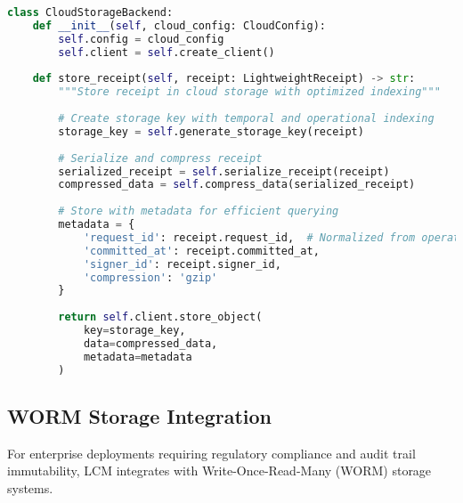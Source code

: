 \documentclass[12pt,a4paper]{article}
\begin{document}
\begin{lstlisting}[language=Python, caption=Cloud Storage Integration]
class CloudStorageBackend:
    def __init__(self, cloud_config: CloudConfig):
        self.config = cloud_config
        self.client = self.create_client()
    
    def store_receipt(self, receipt: LightweightReceipt) -> str:
        """Store receipt in cloud storage with optimized indexing"""
        
        # Create storage key with temporal and operational indexing
        storage_key = self.generate_storage_key(receipt)
        
        # Serialize and compress receipt
        serialized_receipt = self.serialize_receipt(receipt)
        compressed_data = self.compress_data(serialized_receipt)
        
        # Store with metadata for efficient querying
        metadata = {
            'request_id': receipt.request_id,  # Normalized from operation_id
            'committed_at': receipt.committed_at,
            'signer_id': receipt.signer_id,
            'compression': 'gzip'
        }
        
        return self.client.store_object(
            key=storage_key,
            data=compressed_data,
            metadata=metadata
        )
\end{lstlisting}

\subsection{WORM Storage Integration}

For enterprise deployments requiring regulatory compliance and audit trail immutability, LCM integrates with Write-Once-Read-Many (WORM) storage systems.
\end{document}
